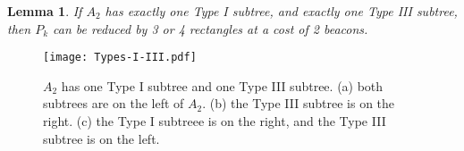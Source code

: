 \documentclass{article}
\newtheorem{lemma}{Lemma}
\begin{document}
		\begin{lemma}\label{lem:onethree}
			If $A_2$ has exactly one Type I subtree, and exactly one Type III subtree,
			then $P_k$ can be reduced by 3 or 4 rectangles at a cost of 2 beacons.
		\end{lemma}
		\begin{figure}[htbp] 
			\begin{center}
				\texttt{[image: Types-I-III.pdf]} 
			\end{center}
			\caption{ $A_2$ has one Type I subtree and one Type III subtree.
					  (a) both subtrees are on the left of $A_2$.
					  (b) the Type III subtree is on the right.
					  (c) the Type I subtreee is on the right, and the Type III subtree is on
					  the left.
					}
			\label{fig:typeonethree}
		\end{figure}
\end{document}

